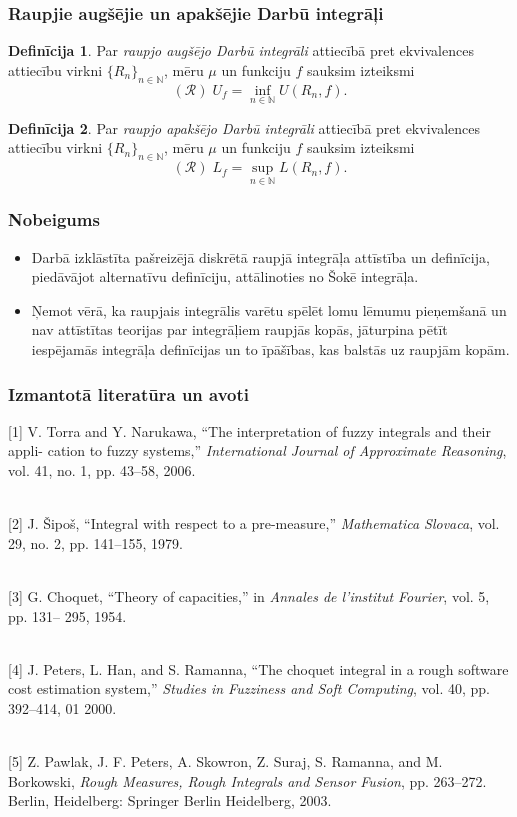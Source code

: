 \documentclass{beamer}
\theoremstyle{definition}
\newtheorem{definicija}{Definīcija}
\begin{document}
\begin{frame}
\frametitle{Raupjie augšējie un apakšējie Darbū integrāļi}
\begin{definicija}
Par \emph{raupjo augšējo Darbū integrāli} attiecībā pret ekvivalences attiecību virkni
  $\{R_n\}_{n\in\mathbb{N}}$, mēru $\mu$ un funkciju $f$ sauksim izteiksmi
  $$
  (\mathcal{R}) \; U_f = \inf\limits_{n\in\mathbb{N}} U(R_n,f).
  $$
\end{definicija}


\begin{definicija}
Par \emph{raupjo apakšējo Darbū integrāli} attiecībā pret ekvivalences attiecību
  virkni $\{R_n\}_{n\in\mathbb{N}}$, mēru $\mu$ un funkciju $f$ sauksim izteiksmi
  $$
  (\mathcal{R}) \; L_f = \sup\limits_{n\in\mathbb{N}} L(R_n,f).
  $$
\end{definicija}
\end{frame}
\begin{frame}
\frametitle{Nobeigums}
\begin{itemize}
\setlength\itemsep{2em}
\item Darbā izklāstīta pašreizējā diskrētā raupjā integrāļa attīstība un definīcija, piedāvājot alternatīvu definīciju, attālinoties no Šokē integrāļa.
\item Ņemot vērā, ka raupjais integrālis varētu spēlēt lomu lēmumu pieņemšanā un nav attīstītas teorijas par integrāļiem raupjās kopās, jāturpina pētīt iespējamās integrāļa definīcijas un to īpāšības, kas balstās uz raupjām kopām. 
\end{itemize}
\end{frame}

\begin{frame}
\frametitle{Izmantotā literatūra un avoti}
\small
[1] V. Torra and Y. Narukawa, “The interpretation of fuzzy integrals and their appli-
cation to fuzzy systems,” \textit{International Journal of Approximate Reasoning}, vol. 41,
no. 1, pp. 43–58, 2006. \\~


[2] J. Šipoš, “Integral with respect to a pre-measure,” \textit{Mathematica Slovaca}, vol. 29,
no. 2, pp. 141–155, 1979.\\~


[3] G. Choquet, “Theory of capacities,” in \textit{Annales de l’institut Fourier}, vol. 5, pp. 131–
295, 1954.\\~


[4] J. Peters, L. Han, and S. Ramanna, “The choquet integral in a rough software cost
estimation system,” \textit{Studies in Fuzziness and Soft Computing}, vol. 40, pp. 392–414,
01 2000.\\~


[5] Z. Pawlak, J. F. Peters, A. Skowron, Z. Suraj, S. Ramanna, and M. Borkowski,
\textit{Rough Measures, Rough Integrals and Sensor Fusion}, pp. 263–272. Berlin, Heidelberg:
Springer Berlin Heidelberg, 2003. 
\end{frame}
\end{document}

